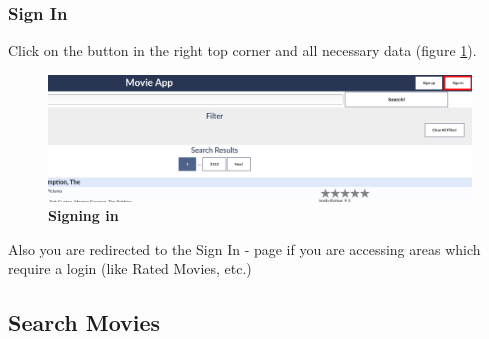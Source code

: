 \documentclass{article}
\begin{document}
\subsubsection{Sign In}

Click on the button in the right top corner and all necessary data (figure \ref{fig_sign_in}).
\begin{figure}[t!]
\includegraphics[scale=0.3]{screenshots_app/sign_in.png}
\caption{\textbf{Signing in}}\label{fig_sign_in}
\end{figure}
Also you are redirected to the Sign In - page if you are accessing areas which require a login (like Rated Movies, etc.)


\subsection{Search Movies}
\end{document}
